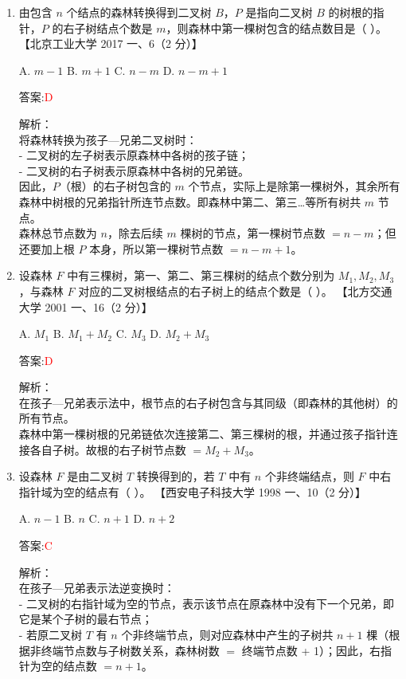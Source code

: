 \documentclass[lang=cn,newtx,10pt,scheme=chinese]{../../../elegantbook}
\begin{document}
\begin{enumerate}
\item 由包含 $n$ 个结点的森林转换得到二叉树 $B$，$P$ 是指向二叉树 $B$ 的树根的指针，$P$ 的右子树结点个数是 $m$，则森林中第一棵树包含的结点数目是（ ）。  
    【北京工业大学 2017 一、6（2 分）】

    A. $m - 1$  
    B. $m + 1$  
    C. $n - m$  
    D. $n - m + 1$

    答案:\textcolor{red}{D}

    解析：\\
    将森林转换为孩子—兄弟二叉树时：\\
    - 二叉树的左子树表示原森林中各树的孩子链；\\
    - 二叉树的右子树表示原森林中各树的兄弟链。\\
    因此，$P$（根）的右子树包含的 $m$ 个节点，实际上是除第一棵树外，其余所有森林中树根的兄弟指针所连节点数。即森林中第二、第三…等所有树共 $m$ 节点。\\
    森林总节点数为 $n$，除去后续 $m$ 棵树的节点，第一棵树节点数 $= n - m$；但还要加上根 $P$ 本身，所以第一棵树节点数 $= n - m + 1$。\\

\item 设森林 $F$ 中有三棵树，第一、第二、第三棵树的结点个数分别为 $M_1, M_2, M_3$，与森林 $F$ 对应的二叉树根结点的右子树上的结点个数是（ ）。  
    【北方交通大学 2001 一、16（2 分）】

    A. $M_1$  
    B. $M_1 + M_2$  
    C. $M_3$  
    D. $M_2 + M_3$

    答案:\textcolor{red}{D}

    解析：\\
    在孩子—兄弟表示法中，根节点的右子树包含与其同级（即森林的其他树）的所有节点。\\
    森林中第一棵树根的兄弟链依次连接第二、第三棵树的根，并通过孩子指针连接各自子树。故根的右子树节点数 $= M_2 + M_3$。\\

\item 设森林 $F$ 是由二叉树 $T$ 转换得到的，若 $T$ 中有 $n$ 个非终端结点，则 $F$ 中右指针域为空的结点有（ ）。  
    【西安电子科技大学 1998 一、10（2 分）】

    A. $n - 1$  
    B. $n$  
    C. $n + 1$  
    D. $n + 2$

    答案:\textcolor{red}{C}

    解析：\\
    在孩子—兄弟表示法逆变换时：\\
    - 二叉树的右指针域为空的节点，表示该节点在原森林中没有下一个兄弟，即它是某个子树的最右节点；\\
    - 若原二叉树 $T$ 有 $n$ 个非终端节点，则对应森林中产生的子树共 $n + 1$ 棵（根据非终端节点数与子树数关系，森林树数 $= $ 终端节点数 + 1）；因此，右指针为空的结点数 $= n + 1$。\\


\end{enumerate}
\end{document}
